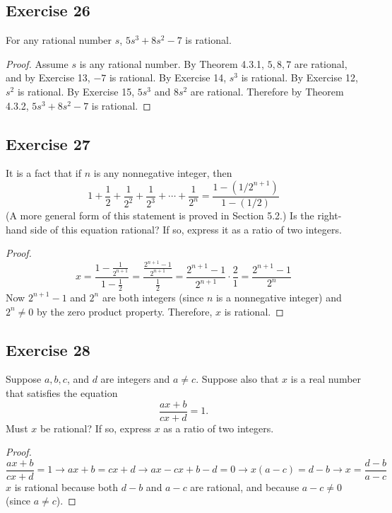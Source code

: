 \documentclass[14pt]{extarticle}
\newcommand{\dps}{\displaystyle}
\begin{document}
\subsection{Exercise 26}
For any rational number $s$, $5s^3 + 8s^2 - 7$ is rational.

\begin{proof}
    Assume $s$ is any rational number. By Theorem 4.3.1, $5, 8, 7$ are rational, and by Exercise 13, $-7$ is rational. By Exercise 14, $s^3$ is rational. By Exercise 12, $s^2$ is rational. By Exercise 15, $5s^3$ and $8s^2$ are rational. Therefore by Theorem 4.3.2, $5s^3 + 8s^2 - 7$ is rational.
\end{proof}

\subsection{Exercise 27}
It is a fact that if $n$ is any nonnegative integer, then
\[
    1 + \frac{1}{2} + \frac{1}{2^2} + \frac{1}{2^3} + \cdots + \frac{1}{2^n} = \frac{1-(1/2^{n+1})}{1-(1/2)}
\]
(A more general form of this statement is proved in Section 5.2.) Is the right-hand side of this equation rational? If so, express it as a ratio of two integers.

\begin{proof}
    \[
        x = \frac{1-\dps\frac{1}{2^{n+1}}}{1-\dps\frac{1}{2}} =
        \frac{\dps\frac{2^{n+1}-1}{2^{n+1}}}{\dps\frac{1}{2}} =
        \dps\frac{2^{n+1}-1}{2^{n+1}}\cdot{\dps\frac{2}{1}} =
        \dps\frac{2^{n+1}-1}{2^{n}}
    \]
    Now $2^{n+1} - 1$ and $2^n$ are both integers (since $n$ is a nonnegative integer) and $2^n \neq 0$ by the zero product
    property. Therefore, $x$ is rational.
\end{proof}

\subsection{Exercise 28}
Suppose $a, b, c$, and $d$ are integers and $a \neq c$. Suppose also that $x$ is a real number that satisfies the
equation
\[
    \frac{ax+b}{cx+d} = 1.
\]
Must $x$ be rational? If so, express $x$ as a ratio of two integers.

\begin{proof}
    \[
        \frac{ax+b}{cx+d} = 1 \to ax+b = cx+d \to ax-cx+b-d = 0 \to x(a-c) = d-b \to x = \frac{d-b}{a-c}
    \]
    $x$ is rational because both $d-b$ and $a-c$ are rational, and because $a-c \neq 0$ (since $a \neq c$).
\end{proof}
\end{document}
